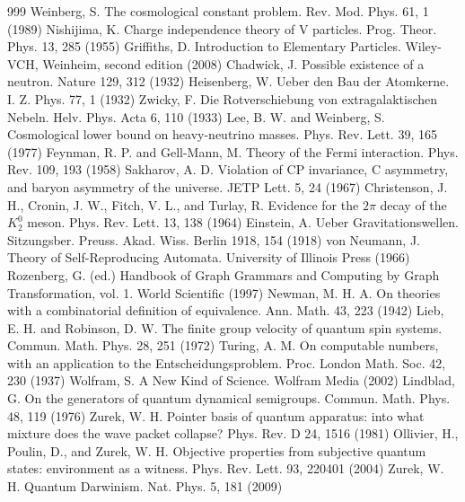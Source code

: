 \begin{thebibliography}{999}
 Weinberg, S. The cosmological constant problem. Rev. Mod. Phys. 61, 1 (1989)
 Nishijima, K. Charge independence theory of V particles. Prog. Theor. Phys. 13, 285 (1955)
 Griffiths, D. Introduction to Elementary Particles. Wiley-VCH, Weinheim, second edition (2008)
 Chadwick, J. Possible existence of a neutron. Nature 129, 312 (1932)
 Heisenberg, W. Ueber den Bau der Atomkerne. I. Z. Phys. 77, 1 (1932)
 Zwicky, F. Die Rotverschiebung von extragalaktischen Nebeln. Helv. Phys. Acta 6, 110 (1933)
 Lee, B. W. and Weinberg, S. Cosmological lower bound on heavy-neutrino masses. Phys. Rev. Lett. 39, 165 (1977)
 Feynman, R. P. and Gell-Mann, M. Theory of the Fermi interaction. Phys. Rev. 109, 193 (1958)
 Sakharov, A. D. Violation of CP invariance, C asymmetry, and baryon asymmetry of the universe. JETP Lett. 5, 24 (1967)
 Christenson, J. H., Cronin, J. W., Fitch, V. L., and Turlay, R. Evidence for the $2\pi$ decay of the $K_2^0$ meson. Phys. Rev. Lett. 13, 138 (1964)
 Einstein, A. Ueber Gravitationswellen. Sitzungsber. Preuss. Akad. Wiss. Berlin 1918, 154 (1918)
 von Neumann, J. Theory of Self-Reproducing Automata. University of Illinois Press (1966)
 Rozenberg, G. (ed.) Handbook of Graph Grammars and Computing by Graph Transformation, vol. 1. World Scientific (1997)
 Newman, M. H. A. On theories with a combinatorial definition of equivalence. Ann. Math. 43, 223 (1942)
 Lieb, E. H. and Robinson, D. W. The finite group velocity of quantum spin systems. Commun. Math. Phys. 28, 251 (1972)
 Turing, A. M. On computable numbers, with an application to the Entscheidungsproblem. Proc. London Math. Soc. 42, 230 (1937)
 Wolfram, S. A New Kind of Science. Wolfram Media (2002)
 Lindblad, G. On the generators of quantum dynamical semigroups. Commun. Math. Phys. 48, 119 (1976)
 Zurek, W. H. Pointer basis of quantum apparatus: into what mixture does the wave packet collapse? Phys. Rev. D 24, 1516 (1981)
 Ollivier, H., Poulin, D., and Zurek, W. H. Objective properties from subjective quantum states: environment as a witness. Phys. Rev. Lett. 93, 220401 (2004)
 Zurek, W. H. Quantum Darwinism. Nat. Phys. 5, 181 (2009)

\end{thebibliography}
